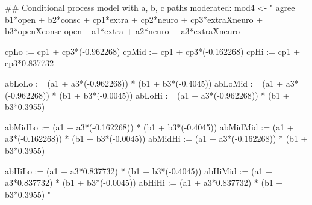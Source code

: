 \begin{Schunk}
\begin{Sinput}
 ## Conditional process model with a, b, c paths moderated:
 mod4 <- "
 agree ~ b1*open + b2*consc + cp1*extra + cp2*neuro + 
         cp3*extraXneuro + b3*openXconsc
 open ~ a1*extra + a2*neuro + a3*extraXneuro
 
 cpLo  := cp1 + cp3*(-0.962268)
 cpMid := cp1 + cp3*(-0.162268)
 cpHi  := cp1 + cp3*0.837732
 
 abLoLo  := (a1 + a3*(-0.962268)) * (b1 + b3*(-0.4045))
 abLoMid := (a1 + a3*(-0.962268)) * (b1 + b3*(-0.0045))
 abLoHi  := (a1 + a3*(-0.962268)) * (b1 + b3*0.3955)
 
 abMidLo  := (a1 + a3*(-0.162268)) * (b1 + b3*(-0.4045))
 abMidMid := (a1 + a3*(-0.162268)) * (b1 + b3*(-0.0045))
 abMidHi  := (a1 + a3*(-0.162268)) * (b1 + b3*0.3955)
 
 abHiLo  := (a1 + a3*0.837732) * (b1 + b3*(-0.4045))
 abHiMid := (a1 + a3*0.837732) * (b1 + b3*(-0.0045))
 abHiHi  := (a1 + a3*0.837732) * (b1 + b3*0.3955)
 "
\end{Sinput}
\end{Schunk}
